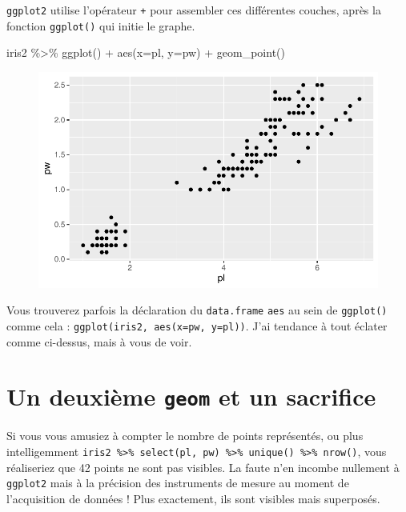 \documentclass[
  letterpaper,
  DIV=11,
  numbers=noendperiod]{scrreprt}
\newenvironment{Shaded}{\begin{snugshade}}{\end{snugshade}}
\newcommand{\AttributeTok}[1]{\textcolor[rgb]{0.40,0.45,0.13}{#1}}
\newcommand{\FunctionTok}[1]{\textcolor[rgb]{0.28,0.35,0.67}{#1}}
\newcommand{\NormalTok}[1]{\textcolor[rgb]{0.00,0.23,0.31}{#1}}
\newcommand{\SpecialCharTok}[1]{\textcolor[rgb]{0.37,0.37,0.37}{#1}}
\begin{document}
\texttt{ggplot2} utilise l'opérateur \texttt{+} pour assembler ces
différentes couches, après la fonction \texttt{ggplot()} qui initie le
graphe.

\begin{Shaded}
\begin{Highlighting}[]
\NormalTok{iris2 }\SpecialCharTok{\%\textgreater{}\%} 
  \FunctionTok{ggplot}\NormalTok{() }\SpecialCharTok{+} 
  \FunctionTok{aes}\NormalTok{(}\AttributeTok{x=}\NormalTok{pl, }\AttributeTok{y=}\NormalTok{pw) }\SpecialCharTok{+} 
  \FunctionTok{geom\_point}\NormalTok{()}
\end{Highlighting}
\end{Shaded}

\begin{figure}[H]

{\centering \includegraphics{ggplot2_files/figure-pdf/unnamed-chunk-3-1.pdf}

}

\end{figure}

Vous trouverez parfois la déclaration du \texttt{data.frame}
\texttt{aes} au sein de \texttt{ggplot()} comme cela :
\texttt{ggplot(iris2,\ aes(x=pw,\ y=pl))}. J'ai tendance à tout éclater
comme ci-dessus, mais à vous de voir.

\hypertarget{un-deuxiuxe8me-geom-et-un-sacrifice}{%
\section{\texorpdfstring{Un deuxième \texttt{geom} et un
sacrifice}{Un deuxième geom et un sacrifice}}\label{un-deuxiuxe8me-geom-et-un-sacrifice}}

Si vous vous amusiez à compter le nombre de points représentés, ou plus
intelligemment
\texttt{iris2\ \%\textgreater{}\%\ select(pl,\ pw)\ \%\textgreater{}\%\ unique()\ \%\textgreater{}\%\ nrow()},
vous réaliseriez que 42 points ne sont pas visibles. La faute n'en
incombe nullement à \texttt{ggplot2} mais à la précision des instruments
de mesure au moment de l'acquisition de données ! Plus exactement, ils
sont visibles mais superposés.
\end{document}
